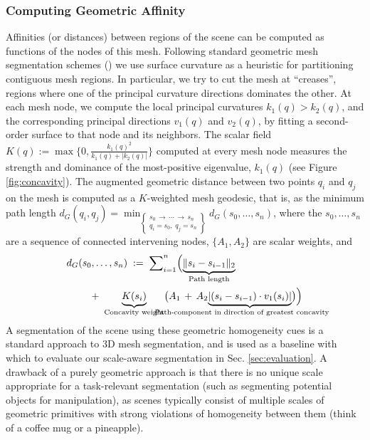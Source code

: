 \subsubsection{Computing Geometric Affinity}\label{sec:curvGeod}
Affinities (or distances) between regions of the scene can be
computed as functions of the nodes of this mesh.
Following standard geometric mesh segmentation schemes
(\cite{Chen:2009:ABF, AZCXT11, lafarge2010})
we use surface curvature
as a heuristic for partitioning contiguous mesh regions.
In particular, we try to cut the mesh at ``creases'', regions where one of 
the principal curvature directions dominates the other.
At each mesh node, we compute the local principal curvatures $k_1(q)>k_2(q)$, and the corresponding 
principal directions $v_1(q)$ and $v_2(q)$, by fitting a second-order surface to that node and its neighbors.
The scalar field $K(q) := \max\{0, \frac{k_1(q)^2}{k_1(q) + |k_2(q)|}\}$ computed at every mesh node measures the strength and
dominance of the most-positive eigenvalue, $k_1(q)$ (see Figure \ref{fig:concavity}).
The augmented geometric distance between two points $q_i$ and $q_j$ on the mesh is computed as a $K$-weighted mesh geodesic,
that is, as the minimum path length $d_G(q_i,q_j) =  \min_{\left\{\substack{s_0\,\rightarrow\,\cdots\,\rightarrow\,s_n\\ q_i=s_0,\;q_j=s_n}\right\}}d_G(s_0,\ldots,s_n)$, where the $s_0,\ldots,s_n$ are a sequence of connected intervening nodes, $\{A_1, A_2\}$ are scalar weights, and
\begin{align}
&d_G(s_0,\ldots,s_n) 
\;:=\; \sum\nolimits_{i=1}^{n}\Bigl(\underset{\text{Path length}}{\underbrace{\|s_i-s_{i-1}\|_2}} \notag \\
&\qquad \;+\; 
\underset{\text{Concavity weight}}{\underbrace{K(s_i)}}\bigl(A_1\,
+\,A_2\underset{\mathclap{\text{Path-component in direction of greatest concavity\qquad}}}{\underbrace{|(s_i-s_{i-1})\cdot v_1(s_i)|}}\bigr)\Bigr) 
\label{eq:dg}
\end{align}
A segmentation of the scene using these geometric homogeneity cues is a standard approach to 3D mesh segmentation, and is used as a baseline with which to evaluate our scale-aware segmentation in Sec. \ref{sec:evaluation}. A drawback of a purely geometric approach
is that there is no unique scale appropriate for a task-relevant segmentation (such as segmenting potential objects for manipulation), as 
scenes typically consist of multiple scales of geometric primitives with strong violations of homogeneity between them (think of a coffee mug or a pineapple).

